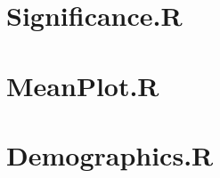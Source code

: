 \section{Significance.R}\label{src:significance}


\section{MeanPlot.R}\label{src:meanPlot}


\section{Demographics.R}\label{src:demographics}

